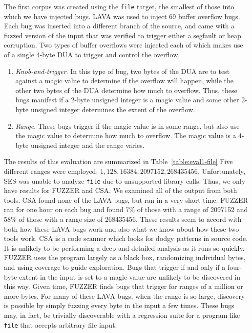 The first corpus was created using the \verb+file+ target, the smallest of those into which we have injected bugs.
LAVA was used to inject 69 buffer overflow bugs.
Each bug was inserted into a different branch of the source, and came with a fuzzed version of the input that was verified to trigger either a segfault or heap corruption.  
Two types of buffer overflows were injected each of which makes use of a single 4-byte DUA to trigger and control the overflow.
\begin{enumerate}
\item \emph{Knob-and-trigger}.  In this type of bug, two bytes of the DUA are to test against a magic value to determine if the overflow will happen, while the other two bytes of the DUA determine how much to overflow.   Thus, these bugs manifest if a 2-byte unsigned integer is a magic value and some other 2-byte unsigned integer determines the extent of the overflow. 
\item \emph{Range}.  These bugs trigger if the magic value is in some range, but also use the magic value to determine how much to overflow.
The magic value is a 4-byte unsigned integer and the range varies.
\end{enumerate}
The results of this evaluation are summarized in Table~\ref{table:eval1-file}
Five different ranges were employed: $1, 128, 16384, 2097152, 268435456$. 
Unfortunately, SES was unable to analyze \verb+file+ due to unsupported library calls.
Thus, we only have results for FUZZER and CSA.
We examined all of the output from both tools.  
CSA found none of the LAVA bugs, but ran in a very short time.  
FUZZER ran for one hour on each bug and found 7\% of those with a range of 2097152 and 58\% of those with a range size of 268435456.
These results seem to accord with both how these LAVA bugs work and also what we know about how these two tools work.
CSA is a code scanner which looks for dodgy patterns in source code.
It is unlikely to be performing a deep and detailed analysis as it runs so quickly.
FUZZER uses the program largely as a black box, randomizing individual bytes, and using coverage to guide exploration.  
Bugs that trigger if and only if a four-byte extent in the input is set to a magic value are unlikely to be discovered in this way.
Given time, FUZZER finds bugs that trigger for ranges of a million or more bytes. 
For many of these LAVA bugs, when the range is so large, discovery is possible by simply fuzzing every byte in the input a few times.  
These bugs may, in fact, be trivially discoverable with a regression suite for a program like \verb+file+ that accepts arbitrary file input.

